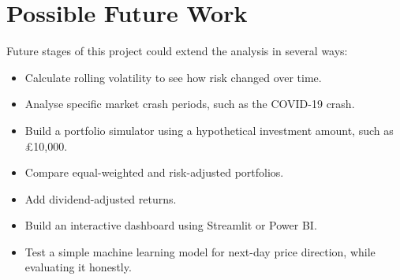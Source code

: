\documentclass[12pt,a4paper]{article}
\begin{document}
\section{Possible Future Work}

Future stages of this project could extend the analysis in several ways:

\begin{itemize}
    \item Calculate rolling volatility to see how risk changed over time.
    \item Analyse specific market crash periods, such as the COVID-19 crash.
    \item Build a portfolio simulator using a hypothetical investment amount, such as \pounds 10,000.
    \item Compare equal-weighted and risk-adjusted portfolios.
    \item Add dividend-adjusted returns.
    \item Build an interactive dashboard using Streamlit or Power BI.
    \item Test a simple machine learning model for next-day price direction, while evaluating it honestly.
\end{itemize}
\end{document}
